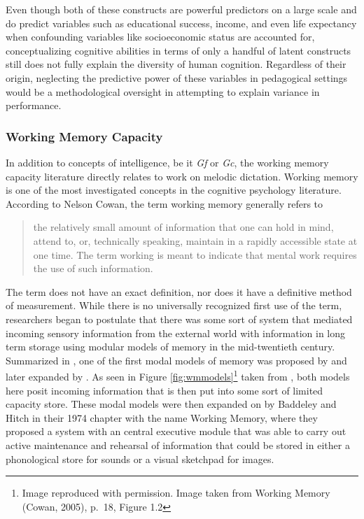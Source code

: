 \documentclass[12pt,]{book}
\let\rmarkdownfootnote\footnote%
\def\footnote{\protect\rmarkdownfootnote}
\begin{document}
Even though both of these constructs are powerful predictors on a large scale and do predict variables such as educational success, income, and even life expectancy \citep{ritchieIntelligenceAllThat2015} when confounding variables like socioeconomic status are accounted for, conceptualizing cognitive abilities in terms of only a handful of latent constructs still does not fully explain the diversity of human cognition.
Regardless of their origin, neglecting the predictive power of these variables in pedagogical settings would be a methodological oversight in attempting to explain variance in performance.

\hypertarget{working-memory-capacity}{%
\subsubsection{Working Memory Capacity}\label{working-memory-capacity}}

In addition to concepts of intelligence, be it \emph{Gf} or \emph{Gc}, the working memory capacity literature directly relates to work on melodic dictation.
Working memory is one of the most investigated concepts in the cognitive psychology literature.
According to Nelson Cowan, the term working memory generally refers to

\begin{quote}
the relatively small amount of information that one can hold in mind, attend to, or, technically speaking, maintain in a rapidly accessible state at one time. The term working is meant to indicate that mental work requires the use of such information. \citep[p.~1]{cowanWorkingMemoryCapacity2005}
\end{quote}

The term does not have an exact definition, nor does it have a definitive method of measurement.
While there is no universally recognized first use of the term, researchers began to postulate that there was some sort of system that mediated incoming sensory information from the external world with information in long term storage using modular models of memory in the mid-twentieth century.
Summarized in \citet{cowanWorkingMemoryCapacity2005}, one of the first modal models of memory was proposed by \citet{broadbentPerceptionCommunication1958} and later expanded by \citet{atkinsonHumanMemoryProposed1968}.
As seen in Figure \ref{fig:wmmodels}\footnote{Image reproduced with permission. Image taken from Working Memory (Cowan, 2005), p.~18, Figure 1.2} taken from \citet{cowanWorkingMemoryCapacity2005}, both models here posit incoming information that is then put into some sort of limited capacity store.
These modal models were then expanded on by Baddeley and Hitch \citep{baddeleyWorkingMemory1974} in their 1974 chapter with the name Working Memory, where they proposed a system with an central executive module that was able to carry out active maintenance and rehearsal of information that could be stored in either a phonological store for sounds or a visual sketchpad for images.
\end{document}
